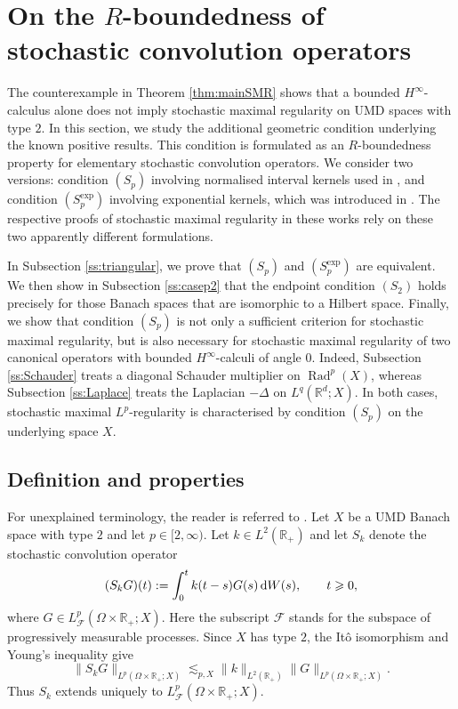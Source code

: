 \documentclass{amsart}
\let\geq\geqslant
\theoremstyle{plain}
\theoremstyle{remark}
\theoremstyle{plain}
\numberwithin{equation}{section}
\newcommand{\R}{\mathbb R}
\newcommand{\1}{\mathbf 1}
\newcommand{\dd}{\,{\rm d}}
\newcommand{\Rad}{\operatorname{Rad}}
\begin{document}
\section{On the \texorpdfstring{$R$}{R}-boundedness of stochastic convolution operators}\label{sec:Rbdd}
The counterexample in Theorem \ref{thm:mainSMR} shows that a bounded $H^\infty$-calculus alone does not imply stochastic maximal regularity on UMD spaces with type $2$. In this section, we study the additional geometric condition underlying the known positive results. This condition is formulated as an $R$-boundedness property for elementary stochastic convolution operators. We consider two versions: condition $(S_p)$ involving normalised interval kernels used in \cite{NVW-SMR,NVW-Rbounded}, and condition $(S_p^{\exp})$ involving exponential kernels, which was introduced in \cite{NVW-survey}. 
The respective proofs of stochastic maximal regularity in these works rely on these two apparently different formulations.

In Subsection \ref{ss:triangular}, we prove that $(S_p)$ and $(S_p^{\exp})$ are equivalent. 
We then show in Subsection \ref{ss:casep2} that the endpoint condition $(S_2)$ holds precisely for those Banach spaces that are isomorphic to a Hilbert space.
Finally, we show that condition $(S_p)$ is not only a sufficient criterion for stochastic maximal regularity, but is also necessary for stochastic maximal regularity of two canonical operators with bounded $H^\infty$-calculi of angle $0$. Indeed, Subsection \ref{ss:Schauder} treats a diagonal Schauder multiplier on $\Rad^p(X)$, whereas Subsection \ref{ss:Laplace} treats the Laplacian $-\Delta$ on $L^q(\R^d;X)$. In both cases, stochastic maximal $L^p$-regularity is characterised by condition $(S_p)$ on the underlying space $X$.

\subsection{Definition and properties}\label{ss:RbddX}
For unexplained terminology, the reader is referred to \cite{HNVW1, HNVW2, HNVW3}. Let $X$ be a UMD Banach space with type $2$ and let $p\in[2,\infty)$. Let $k\in L^2(\R_+)$ and let $S_k$ denote the stochastic convolution operator
\[
    (S_k G)(t) :=\int_0^t k(t-s) G(s)\dd W(s), \qquad t\geq 0,
\]
where $G\in L^p_{\mathscr F}(\Omega\times \R_+;X)$. Here the subscript $\mathscr{F}$ stands for the subspace of progressively measurable processes.
Since $X$ has type $2$, the It\^o isomorphism and Young's
inequality give
\[
        \|S_kG\|_{L^p(\Omega\times\R_+;X)}\lesssim_{p,X}\|k\|_{L^2(\R_+)}        \|G\|_{L^p(\Omega\times\R_+;X)}.
\]
Thus $S_k$ extends uniquely to
$L^p_{\mathscr F}(\Omega\times\R_+;X)$.
\end{document}
